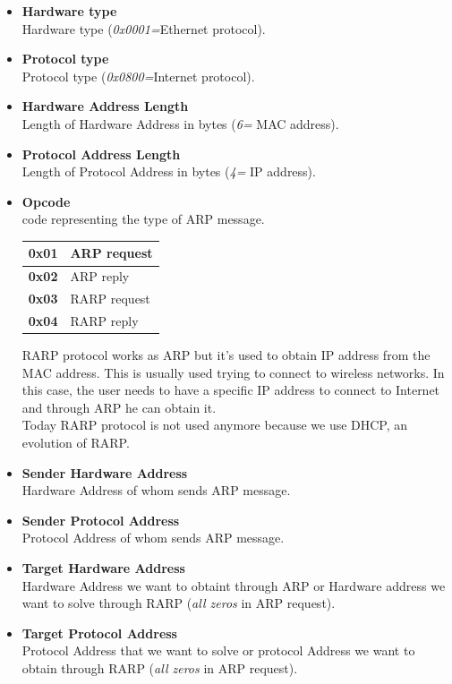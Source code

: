 \begin{itemize}
\item{\textbf{Hardware type}\\
Hardware type (\textit{0x0001=}Ethernet protocol).}
\item{\textbf{Protocol type}\\
Protocol type (\textit{0x0800=}Internet protocol).}
\item{\textbf{Hardware Address Length}\\
Length of Hardware Address in bytes (\textit{6=} MAC address).}
\item{\textbf{Protocol Address Length}\\
Length of Protocol Address in bytes (\textit{4=} IP address).}
\item{\textbf{Opcode}\\
code representing the type of ARP message.
\begin{table}[H]
\centering \footnotesize
\begin{tabular}{|c|l|}
\hline
\textbf{0x01}&{ARP request}\\
\hline
\textbf{0x02}&{ARP reply}\\
\hline
\textbf{0x03}&{RARP request}\\
\hline
\textbf{0x04}&{RARP reply}\\
\hline
\end{tabular}
\end{table}
RARP protocol works as ARP but it's used to obtain IP address from the MAC address. This is usually used trying to connect to wireless networks. In this case, the user needs to have a specific IP address to connect to Internet and through ARP he can obtain it.\\ Today RARP protocol is not used anymore because we use DHCP, an evolution of RARP.
}
\item{\textbf{Sender Hardware Address}\\
Hardware Address of whom sends ARP message.}
\item{\textbf{Sender Protocol Address}\\
Protocol Address of whom sends ARP message.}
\item{\textbf{Target Hardware Address}\\
Hardware Address we want to obtaint through ARP or Hardware address we want to solve through RARP (\textit{all zeros} in ARP request).}
\item{\textbf{Target Protocol Address}\\
Protocol Address that we want to solve or protocol Address we want to obtain through RARP (\textit{all zeros} in ARP request).}
\end{itemize}